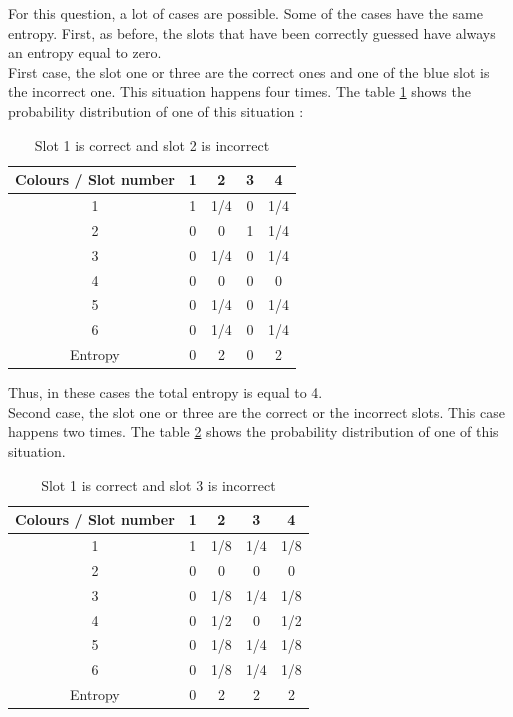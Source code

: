 \documentclass[titlepage]{article}
\begin{document}
For this question, a lot of cases are possible. Some of the cases have the same entropy. First, as before, the slots that have been correctly guessed have always an entropy equal to zero. \\

First case, the slot one or three are the correct ones and one of the blue slot is the incorrect one. This situation happens four times. The table \ref{tab:case1} shows the probability distribution of one of this situation :

\begin{table}[h!]
\centering
\begin{tabular}{|c|c|c|c|c|}
        \hline
        Colours / Slot number & 1 & 2 & 3 & 4 \\ 
        \hline
        1 & 1 & 1/4 & 0 & 1/4 \\
        \hline
        2 & 0 & 0 & 1 & 1/4 \\
        \hline
        3 & 0 & 1/4 & 0 & 1/4 \\
        \hline
        4 & 0 & 0 & 0 & 0 \\
        \hline
        5 & 0 & 1/4 & 0 & 1/4 \\
        \hline
        6 & 0 & 1/4 & 0 & 1/4\\
        \hline
        Entropy & 0 & 2 & 0 & 2\\
        \hline
   
\end{tabular}
 \caption{Slot 1 is correct and slot 2 is incorrect}
 \label{tab:case1}
\end{table}


Thus, in these cases the total entropy is equal to 4. \\

Second case, the slot one or three are the correct or the incorrect slots. This case happens two times. The table \ref{tab:case2} shows the probability distribution of one of this situation.  

\begin{table}[h!]
\centering
\begin{tabular}{|c|c|c|c|c|}
        \hline
        Colours / Slot number & 1 & 2 & 3 & 4 \\ 
        \hline
        1 & 1 & 1/8 & 1/4 & 1/8\\
        \hline
        2 & 0 & 0 & 0 & 0\\
        \hline
        3 & 0 & 1/8 & 1/4 & 1/8 \\
        \hline
        4 & 0 & 1/2 & 0 & 1/2 \\
        \hline
        5 & 0 & 1/8 & 1/4 & 1/8 \\
        \hline
        6 & 0 & 1/8 & 1/4 & 1/8 \\
        \hline
        Entropy & 0 & 2 & 2 & 2 \\
        \hline     
\end{tabular}
\caption{Slot 1 is correct and slot 3 is incorrect}
\label{tab:case2}
\end{table}
\end{document}
